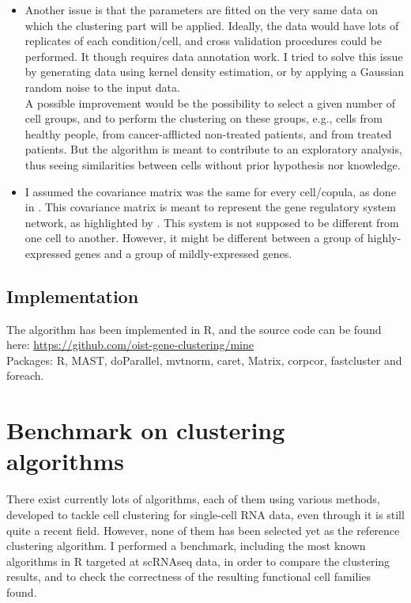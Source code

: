 \documentclass{report}
\begin{document}
{\begin{itemize}
\item Another issue is that the parameters are fitted on the very same data on which the clustering part will be applied. Ideally, the data would have lots of replicates of each condition/cell, and cross validation procedures could be performed. It though requires data annotation work. I tried to solve this issue by generating data using kernel density estimation, or by applying a Gaussian random noise to the input data.\\

A possible improvement would be the possibility to select a given number of cell groups, and to perform the clustering on these groups, e.g., cells from healthy people, from cancer-afflicted non-treated patients, and from treated patients. But the algorithm is meant to contribute to an exploratory analysis, thus seeing similarities between cells without prior hypothesis nor knowledge.

\item I assumed the covariance matrix was the same for every cell/copula, as done in \cite{zhang2017classification}. This covariance matrix is meant to represent the gene regulatory system network, as highlighted by \cite{schafer2005shrinkage}. This system is not supposed to be different from one cell to another. However, it might be different between a group of highly-expressed genes and a group of mildly-expressed genes.

\end{itemize}

\section{Implementation}

The algorithm has been implemented in R, and the source code can be found here: {\url{https://github.com/oist-gene-clustering/mine}}\\

Packages: R\cite{baser}, MAST\cite{mastr}, doParallel\cite{doparallelr}, mvtnorm\cite{mvtnormr}, caret\cite{caretr}, Matrix\cite{matrixr}, corpcor\cite{corpcorr}, fastcluster\cite{fastclusterr} and foreach\cite{foreachr}.\\

\chapter{Benchmark on clustering algorithms}

There exist currently lots of algorithms, each of them using various methods, developed to tackle cell clustering for single-cell RNA data, even through it is still quite a recent field. However, none of them has been selected yet as the reference clustering algorithm. I performed a benchmark, including the most known algorithms in R targeted at scRNAseq data, in order to compare the clustering results, and to check the correctness of the resulting functional cell families found.\\

}
\end{document}
